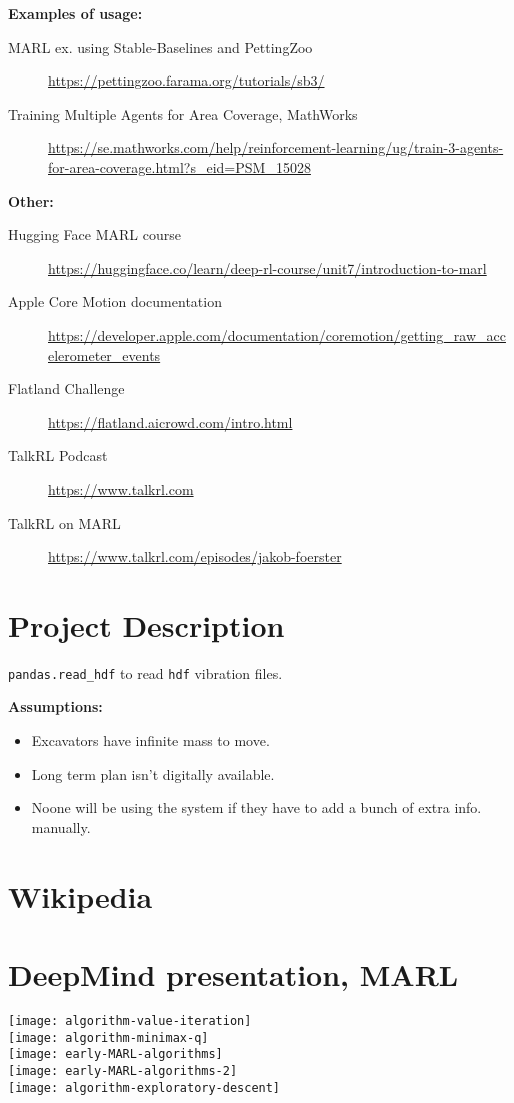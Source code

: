 \documentclass{article}
\begin{document}
\noindent
\textbf{Examples of usage:}
\begin{description}
  \item[MARL ex. using Stable-Baselines and PettingZoo] \url{https://pettingzoo.farama.org/tutorials/sb3/}
  \item[Training Multiple Agents for Area Coverage, MathWorks] \url{https://se.mathworks.com/help/reinforcement-learning/ug/train-3-agents-for-area-coverage.html?s_eid=PSM_15028}
\end{description}

\noindent
\textbf{Other:}
\begin{description}
  \item[Hugging Face MARL course] \url{https://huggingface.co/learn/deep-rl-course/unit7/introduction-to-marl}
  \item[Apple Core Motion documentation] \url{https://developer.apple.com/documentation/coremotion/getting_raw_accelerometer_events}
  \item[Flatland Challenge] \url{https://flatland.aicrowd.com/intro.html}
  \item[TalkRL Podcast] \url{https://www.talkrl.com}
  \item[TalkRL on MARL] \url{https://www.talkrl.com/episodes/jakob-foerster}
\end{description}


\section*{Project Description}          \label{sec.proj_desc}
\texttt{pandas.read_hdf} to read \texttt{hdf} vibration files.

\noindent
\textbf{Assumptions:}
\begin{itemize}
  \item Excavators have infinite mass to move.\\
  \item Long term plan isn't digitally available.\\
  \item Noone will be using the system if they have to add a bunch of extra info. manually.
\end{itemize}


\section*{Wikipedia}          \label{sec.wiki}


\section*{DeepMind presentation, MARL}\label{sec.deepmind}
\texttt{[image: algorithm-value-iteration]}\\
\texttt{[image: algorithm-minimax-q]}\\
\texttt{[image: early-MARL-algorithms]}\\
\texttt{[image: early-MARL-algorithms-2]}\\
\texttt{[image: algorithm-exploratory-descent]}\\
\end{document}
